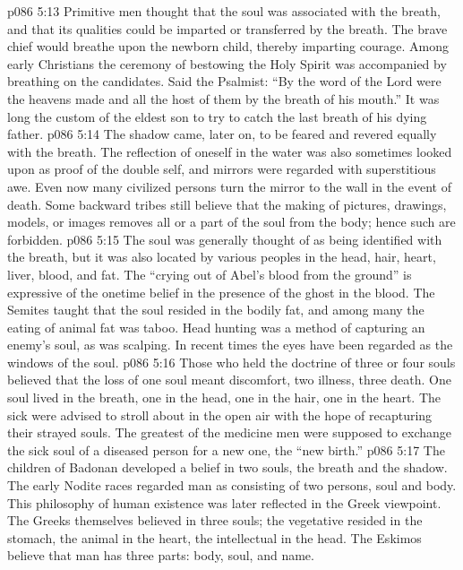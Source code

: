 \vs p086 5:13 Primitive men thought that the soul was associated with the breath, and that its qualities could be imparted or transferred by the breath. The brave chief would breathe upon the newborn child, thereby imparting courage. Among early Christians the ceremony of bestowing the Holy Spirit was accompanied by breathing on the candidates. Said the Psalmist: “By the word of the Lord were the heavens made and all the host of them by the breath of his mouth.” It was long the custom of the eldest son to try to catch the last breath of his dying father.
\vs p086 5:14 The shadow came, later on, to be feared and revered equally with the breath. The reflection of oneself in the water was also sometimes looked upon as proof of the double self, and mirrors were regarded with superstitious awe. Even now many civilized persons turn the mirror to the wall in the event of death. Some backward tribes still believe that the making of pictures, drawings, models, or images removes all or a part of the soul from the body; hence such are forbidden.
\vs p086 5:15 The soul was generally thought of as being identified with the breath, but it was also located by various peoples in the head, hair, heart, liver, blood, and fat. The “crying out of Abel’s blood from the ground” is expressive of the onetime belief in the presence of the ghost in the blood. The Semites taught that the soul resided in the bodily fat, and among many the eating of animal fat was taboo. Head hunting was a method of capturing an enemy’s soul, as was scalping. In recent times the eyes have been regarded as the windows of the soul.
\vs p086 5:16 Those who held the doctrine of three or four souls believed that the loss of one soul meant discomfort, two illness, three death. One soul lived in the breath, one in the head, one in the hair, one in the heart. The sick were advised to stroll about in the open air with the hope of recapturing their strayed souls. The greatest of the medicine men were supposed to exchange the sick soul of a diseased person for a new one, the “new birth.”
\vs p086 5:17 The children of Badonan developed a belief in two souls, the breath and the shadow. The early Nodite races regarded man as consisting of two persons, soul and body. This philosophy of human existence was later reflected in the Greek viewpoint. The Greeks themselves believed in three souls; the vegetative resided in the stomach, the animal in the heart, the intellectual in the head. The Eskimos believe that man has three parts: body, soul, and name.

